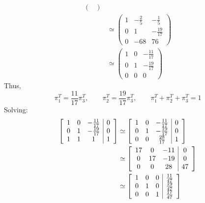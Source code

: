 \documentclass[10pt, oneside]{article}
\theoremstyle{definition}
\begin{document}
\begin{enumerate}
\begin{solution}
\begin{align*}
\begin{pmatrix}
            \end{pmatrix}\\
            &\simeq
            \begin{pmatrix}
            1 & -\frac{2}{5} & - \frac{1}{5}\\
            0 & 1 & -\frac{19}{17}\\
            0 & -68 & 76
            \end{pmatrix}\\
            &\simeq
            \begin{pmatrix}
            1 & 0 & - \frac{11}{17}\\
            0 & 1 & -\frac{19}{17}\\
            0 & 0 & 0
            \end{pmatrix}
        \end{align*}
        Thus, 
        \[\pi_1^T = \frac{11}{17}\pi_3^T, \qquad \pi_2^T = \frac{19}{17}\pi_3^T, \qquad \pi_1^T + \pi_2^T + \pi_3^T = 1\] Solving:
        \begin{align*}
            \left[\begin{array}{ccc | c}
               1  & 0 &-\frac{11}{17} & 0 \\
               0  & 1 &-\frac{19}{17} & 0\\
               1 & 1 & 1 & 1
            \end{array}\right] &\simeq
            \left[\begin{array}{ccc | c}
               1  & 0 &-\frac{11}{17} & 0 \\
               0  & 1 &-\frac{19}{17} & 0\\
               0 & 0 & \frac{28}{17} & 1
            \end{array}\right]\\
            &\simeq
            \left[\begin{array}{ccc | c}
               17  & 0 &-11 & 0 \\
               0  & 17 &-19 & 0\\
               0 & 0 & 28 & 47
            \end{array}\right]\\
            &\simeq
            \left[\begin{array}{ccc | c}
               1  & 0 &0 & \frac{11}{47} \\
               0  & 1 &0 & \frac{19}{47 }\\
               0 & 0 & 1 & \frac{17}{47}
            \end{array}\right]

\end{align*}
\end{solution}
\end{enumerate}
\end{document}
